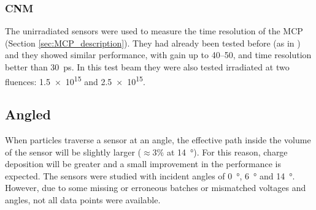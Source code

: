 \subsubsection{CNM}

The unirradiated sensors were used to measure the time resolution of the MCP (Section \ref{sec:MCP_description}). They had already been tested before (as in \cite{Allaire:2018bof}) and they showed similar performance, with gain up to \qtyrange{40}{50}{}, and time resolution better than \qty{30}{\pico\second}. In this test beam they were also tested irradiated at two fluences: \qty{1.5e15}{\neutroneq} and \qty{2.5e15}{\neutroneq}.

\begin{figure}[h!tbp]
    \centering
    \hfill
    \vfill
    \begin{minipage}[c]{.47\linewidth}
    \end{minipage}
    \hfill
    \begin{minipage}[c]{.5\linewidth}
\end{minipage}
\end{figure}

\FloatBarrier 

\subsection{Angled}

When particles traverse a sensor at an angle, the effective path inside the volume of the sensor will be slightly larger (\(\approx3\%\) at \qty{14}{\degree}). For this reason, charge deposition will be greater and a small improvement in the performance is expected.
The sensors were studied with incident angles of \qty{0}{\degree}, \qty{6}{\degree} and \qty{14}{\degree}. However, due to some missing or erroneous batches or mismatched voltages and angles, not all data points were available.

